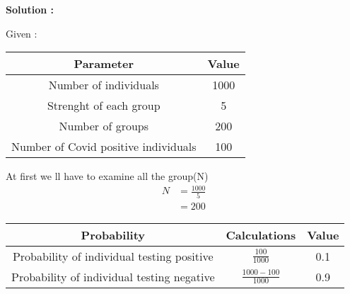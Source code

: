 \documentclass[journal,12pt,onecolumn]{IEEEtran}
\begin{document}
\textbf{Solution :}


Given : \\
\begin{table}[H]
\def\arraystretch{1.2}
\begin{tabular}{|c|c|}
\hline
	\textbf{Parameter} &\textbf{Value} \\ \hline
	Number of individuals &1000 \\ \hline
	Strenght of each group &5 \\ 
	\hline
	Number of groups &200 \\ 
	\hline
	Number of Covid positive individuals &100 \\ \hline
	
	
\end{tabular}
\end{table}
At first we ll have to examine all the group(N)
\begin{align}
N&=\frac{1000}{5} \\
&= 200
\end{align}
\begin{table}[h]
\def\arraystretch{1.2}
\begin{tabular}{|c|c|c|}
\hline
	\textbf{Probability} &\textbf{Calculations} &\textbf{Value}  \\ \hline
	Probability of individual testing positive &$\frac{100}{1000}$ &0.1 \\ \hline
	Probability of individual testing negative &$\frac{1000-100}{1000}$  &0.9 \\ 
	\hline
	
	
\end{tabular}
\end{table}
\end{document}
